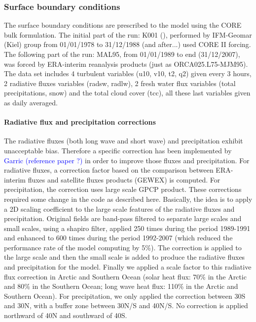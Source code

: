 \documentclass[12pt]{article}
\begin{document}
\scriptsize


\normalsize

\subsubsection{Surface boundary conditions}

The surface boundary conditions are prescribed to the model using the CORE bulk formulation. The initial part of the run: K001 (\cite{Scheinert}), performed by IFM-Geomar (Kiel) group from 01/01/1978 to 31/12/1988 (and after...) used CORE II forcing.
The following part of the run: MAL95, from 01/01/1989 to end (31/12/2007), was forced by ERA-interim reanalysis products (just as ORCA025.L75-MJM95). The data set includes 4 turbulent variables (u10, v10, t2, q2) given every 3 hours, 2 radiative fluxes variables (radsw, radlw), 2 fresh water flux variables (total precipitations, snow) and the total cloud cover (tcc), all these last variables given as daily averaged.

\scriptsize




\normalsize

\paragraph{Radiative flux and precipitation corrections \\}

The radiative fluxes (both long wave and short wave) and precipitation exhibit unacceptable bias. Therefore a specific correction has been implemented by \textcolor{blue}{Garric (reference paper ?)} in order to improve those fluxes and precipitation. For radiative fluxes, a correction factor based on the comparison between ERA-interim fluxes and satellite fluxes products (GEWEX) is computed. For precipitation, the correction uses large scale GPCP product. These corrections required some change in the code as described here. Basically, the idea is to apply a 2D scaling coefficient to the large scale features of the radiative fluxes and precipitation. Original fields are band-pass filtered to separate large scales and small scales, using a shapiro filter, applied 250 times during the period 1989-1991 and enhanced to 600 times during the period 1992-2007 (which reduced the performance rate of the model computing by 5\%). The correction is applied to the large scale and then the small scale is added to produce the radiative fluxes and precipitation for the model. Finally we applied a scale factor to this radiative flux correction in Arctic and Southern Ocean (solar heat flux: 70\% in the Arctic and 80\% in the Southern Ocean; long wave heat flux: 110\% in the Arctic and Southern Ocean). For precipitation, we only applied the correction between 30\degres S and 30\degres N, with a buffer zone between 30\degres N/S and 40\degres N/S. No correction is applied northward of 40\degres N and southward of 40\degres S.
\end{document}
